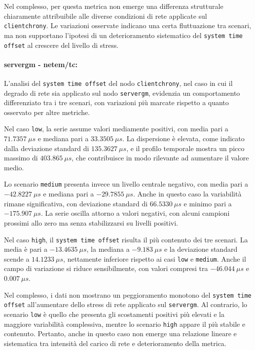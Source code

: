 Nel complesso, per questa metrica non emerge una differenza strutturale chiaramente
attribuibile alle diverse condizioni di rete applicate sul \texttt{clientchrony}.
Le variazioni osservate indicano una certa fluttuazione tra scenari, ma non
supportano l’ipotesi di un deterioramento sistematico del \texttt{system time
offset} al crescere del livello di stress.

\paragraph*{servergm - netem/tc:}
L’analisi del \texttt{system time offset} del nodo \texttt{clientchrony}, nel caso
in cui il degrado di rete sia applicato sul nodo \texttt{servergm}, evidenzia un comportamento
differenziato tra i tre scenari, con variazioni più marcate rispetto a quanto
osservato per altre metriche.

Nel caso \texttt{low}, la serie assume valori mediamente positivi, con media pari
a $71.7357~\mu s$ e mediana pari a $33.3505~\mu s$. La dispersione è elevata, come
indicato dalla deviazione standard di $135.3627~\mu s$, e il profilo temporale
mostra un picco massimo di $403.865~\mu s$, che contribuisce in modo rilevante ad
aumentare il valore medio.

Lo scenario \texttt{medium} presenta invece un livello centrale negativo, con media
pari a $-42.8227~\mu s$ e mediana pari a $-29.7855~\mu s$. Anche in questo caso
la variabilità rimane significativa, con deviazione standard di $66.5330~\mu s$ e
minimo pari a $-175.907~\mu s$. La serie oscilla attorno a valori negativi, con alcuni
campioni prossimi allo zero ma senza stabilizzarsi su livelli positivi.

Nel caso \texttt{high}, il \texttt{system time offset} risulta il più contenuto
dei tre scenari. La media è pari a $-13.4635~\mu s$, la mediana a $-9.183~\mu s$
e la deviazione standard scende a $14.1233~\mu s$, nettamente inferiore rispetto ai
casi \texttt{low} e \texttt{medium}. Anche il campo di variazione si riduce
sensibilmente, con valori compresi tra $-46.044~\mu s$ e $0.007~\mu s$.

Nel complesso, i dati non mostrano un peggioramento monotono del \texttt{system
time offset} all’aumentare dello stress di rete applicato sul \texttt{servergm}. Al
contrario, lo scenario \texttt{low} è quello che presenta gli scostamenti positivi
più elevati e la maggiore variabilità complessiva, mentre lo scenario \texttt{high}
appare il più stabile e contenuto. Pertanto, anche in questo caso non emerge una relazione
lineare e sistematica tra intensità del carico di rete e deterioramento della metrica.

